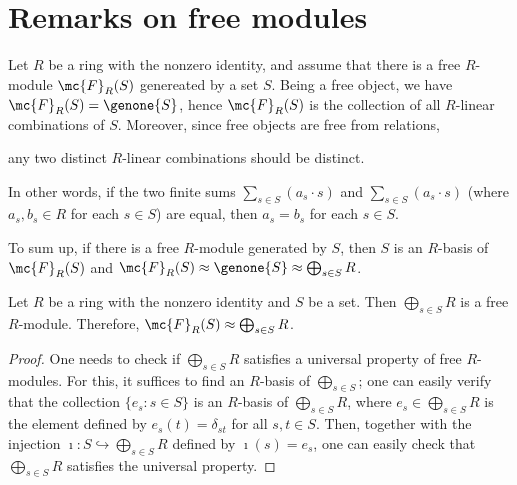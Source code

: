 \section{Remarks on free modules}

\begin{obs}\label{free module iff there is a basis}
    Let $R$ be a ring with the nonzero identity, and assume that there is a free $R$-module $\mc{F}_R(S)$ genereated by a set $S$.
    Being a free object, we have $\mc{F}_R(S)=\genone{S}$, hence $\mc{F}_R(S)$ is the collection of all $R$-linear combinations of $S$.
    Moreover, since free objects are free from relations,
    \begin{center}
        any two distinct $R$-linear combinations should be distinct.
    \end{center}
    In other words, if the two finite sums $\sum_{s\in S}(a_s\cdot s)$ and $\sum_{s\in S}(a_s\cdot s)$ (where $a_s, b_s\in R$ for each $s\in S$) are equal, then $a_s=b_s$ for each $s\in S$.

    To sum up, if there is a free $R$-module generated by $S$, then $S$ is an $R$-basis of $\mc{F}_R(S)$ and $\mc{F}_R(S)\approx\genone{S}\approx\bigoplus_{s\in S}R$.
\end{obs}

\begin{thm}\label{existence of free modules}
    Let $R$ be a ring with the nonzero identity and $S$ be a set.
    Then $\bigoplus_{s\in S} R$ is a free $R$-module.
    Therefore, $\mc{F}_R(S)\approx\bigoplus_{s\in S} R$.
\end{thm}
\begin{proof}
    One needs to check if $\bigoplus_{s\in S} R$ satisfies a universal property of free $R$-modules.
    For this, it suffices to find an $R$-basis of $\bigoplus_{s\in S}$; one can easily verify that the collection $\{e_s: s\in S\}$ is an $R$-basis of $\bigoplus_{s\in S}R$, where $e_s\in\bigoplus_{s\in S}R$ is the element defined by $e_s(t)=\delta_{st}$ for all $s, t\in S$.
    Then, together with the injection $\imath: S\hookrightarrow\bigoplus_{s\in S} R$ defined by $\imath(s)=e_s$, one can easily check that $\bigoplus_{s\in S} R$ satisfies the universal property.
\end{proof}

